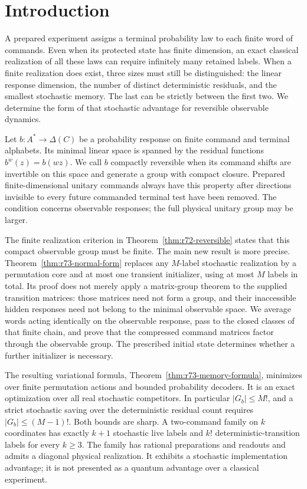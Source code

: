 \section{Introduction}\label{sec:current-overview}\label{sec:introduction}
A prepared experiment assigns a terminal probability law to each finite
word of commands. Even when its protected state has finite dimension,
an exact classical realization of all these laws can require infinitely
many retained labels. When a finite realization does exist, three sizes
must still be distinguished: the linear response dimension, the number
of distinct deterministic residuals, and the smallest stochastic memory.
The last can be strictly between the first two. We determine the form of
that stochastic advantage for reversible observable dynamics.

Let $b:A^*\to\Delta(C)$ be a probability response on finite command and
terminal alphabets. Its minimal linear space is spanned by the residual
functions $b^w(z)=b(wz)$. We call $b$ compactly reversible when its command
shifts are invertible on this space and generate a group with compact
closure. Prepared finite-dimensional unitary commands always have this
property after directions invisible to every future commanded terminal
test have been removed. The condition concerns observable responses;
the full physical unitary group may be larger.

The finite realization criterion in Theorem~\ref{thm:r72-reversible}
states that this compact observable group must be finite. The main new
result is more precise. Theorem~\ref{thm:r73-normal-form} replaces any
$M$-label stochastic realization by a permutation core and at most one
transient initializer, using at most $M$ labels in total. Its proof does
not merely apply a matrix-group theorem to the supplied transition
matrices: those matrices need not form a group, and their inaccessible
hidden responses need not belong to the minimal observable space. We
average words acting identically on the observable response, pass to the
closed classes of that finite chain, and prove that the compressed
command matrices factor through the observable group. The prescribed
initial state determines whether a further initializer is necessary.

The resulting variational formula, Theorem~\ref{thm:r73-memory-formula},
minimizes over finite permutation actions and bounded probability
decoders. It is an exact optimization over all real stochastic
competitors. In particular $|G_b|\le M!$, and a strict stochastic saving
over the deterministic residual count requires
$|G_b|\le(M-1)!$. Both bounds are sharp. A two-command family on $k$
coordinates has exactly $k+1$ stochastic live labels and $k!$
deterministic-transition labels for every $k\ge3$. The family has
rational preparations and readouts and admits a diagonal physical
realization. It exhibits a stochastic implementation advantage; it is
not presented as a quantum advantage over a classical experiment.

